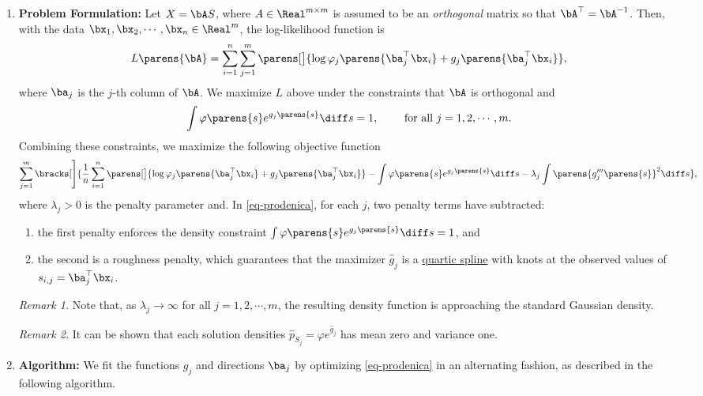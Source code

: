 \documentclass[12pt]{article}
\begin{document}
\begin{enumerate}[label=\textbf{\arabic*.}]
	\item \textbf{Problem Formulation:} Let $X = \bA S$, where $A \in \Real^{m \times m}$ is assumed to be an \emph{orthogonal} matrix so that $\bA^\top = \bA^{-1}$. Then, with the data $\bx_1, \bx_2, \cdots, \bx_n \in \Real^m$, the log-likelihood function is 
	\begin{align*}
		L \parens{\bA} = \sum_{i=1}^n \sum_{j=1}^m \parens[\big]{\log \varphi_j \parens{\ba_j^\top \bx_i} + g_j \parens{\ba_j^\top \bx_i}}, 
	\end{align*}
	where $\ba_j$ is the $j$-th column of $\bA$. 
	We maximize $L$ above under the constraints that $\bA$ is orthogonal and 
	\begin{align*}
		\int \varphi \parens{s} e^{g_j \parens{s}} \diff s = 1, \qquad \text{ for all } j = 1, 2, \cdots, m. 
	\end{align*}
	Combining these constraints, we maximize the following objective function 
	\begin{align}\label{eq-prodenica}
		\sum_{j=1}^m \bracks[\Bigg]{\frac{1}{n} \sum_{i=1}^n \parens[\big]{\log \varphi_j \parens{\ba_j^\top \bx_i} + g_j \parens{\ba_j^\top \bx_i}} - \int \varphi \parens{s} e^{g_j \parens{s}} \diff s - \lambda_j \int \parens{g_j''' \parens{s}}^2 \diff s}, 
	\end{align}
	where $\lambda_j > 0$ is the penalty parameter and. In \eqref{eq-prodenica}, for each $j$, two penalty terms have subtracted: 
	\begin{enumerate}
		\item the first penalty enforces the density constraint $\int \varphi \parens{s} e^{g_j \parens{s}} \diff s = 1$, and 
		\item the second is a roughness penalty, which guarantees that the maximizer $\hat{g}_j$ is a \underline{quartic spline} with knots at the observed values of $s_{i,j} = \ba_j^\top \bx_i$. 
	\end{enumerate}
	
	\textit{Remark 1.} Note that, as $\lambda_j \to \infty$ for all $j = 1, 2, \cdots, m$, the resulting density function is approaching the standard Gaussian density. 
	
	\textit{Remark 2.} It can be shown that each solution densities $\hat{p}_{S_j} = \varphi e^{\hat{g}_j}$ has mean zero and variance one. 
	
	\item \textbf{Algorithm:} We fit the functions $g_j$ and directions $\ba_j$ by optimizing \eqref{eq-prodenica} in an alternating fashion, as described in the following algorithm. 
	

\end{enumerate}
\end{document}
